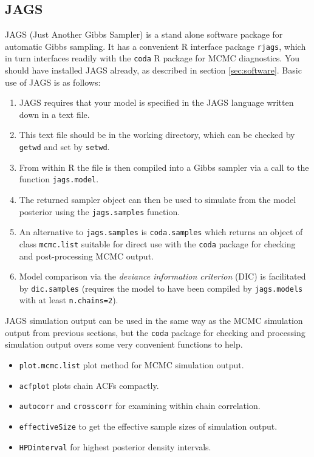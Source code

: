 \documentclass[10pt] {article}
\theoremstyle{definition}
\begin{document}
\subsection{JAGS \label{sec:jags}}

JAGS (Just Another Gibbs Sampler) is a stand alone software package for automatic Gibbs sampling. It has a convenient R interface package {\tt rjags}, which in turn interfaces readily with the {\tt coda} R package for MCMC diagnostics. You should have installed JAGS already, as described in section \ref{sec:software}. Basic use of JAGS is as follows:
\begin{enumerate}
\item JAGS requires that your model is specified in the JAGS language written down in a text file.
\item This text file should be in the working directory, which can be checked by {\tt getwd} and set by {\tt setwd}.
\item From within R the file is then compiled into a Gibbs sampler via a call to the function {\tt jags.model}.
\item The returned sampler object can then be used to simulate from the model posterior using the {\tt jags.samples} function.
\item An alternative to {\tt jags.samples} is {\tt coda.samples} which returns an object of class {\tt mcmc.list} suitable for direct use with the {\tt coda} package for checking and post-processing MCMC output. 
\item Model comparison via the {\em deviance information criterion} (DIC) is facilitated by {\tt dic.samples} (requires the model to have been compiled by {\tt jags.models} with at least {\tt n.chains=2}).
\end{enumerate}
JAGS simulation output can be used in the same way as the MCMC simulation output from previous sections, but the {\tt coda} package for checking and processing simulation output overs some very convenient functions to help.
\begin{itemize}
\item {\tt plot.mcmc.list} plot method for MCMC simulation output.
\item {\tt acfplot} plots chain ACFs compactly.
\item {\tt autocorr} and {\tt crosscorr} for examining within chain correlation.
\item {\tt effectiveSize} to get the effective sample sizes of simulation output.
\item {\tt HPDinterval} for highest posterior density intervals.
\end{itemize}
\end{document}
